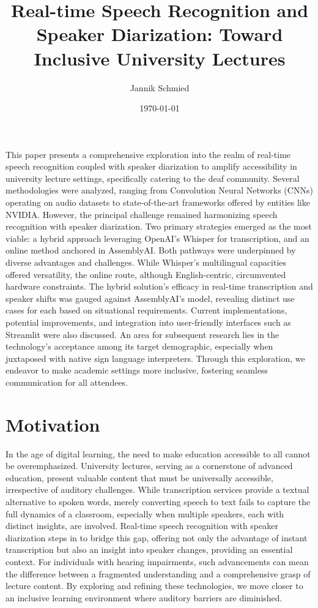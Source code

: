 \documentclass[12pt]{article}
\title{Real-time Speech Recognition and Speaker Diarization: Toward Inclusive University Lectures}
\author{Jannik Schmied}
\date{\today}
\begin{document}
\maketitle

\textbf{\abstractname}
This paper presents a comprehensive exploration into the realm of real-time speech recognition coupled with speaker diarization to amplify accessibility in university lecture settings, specifically catering to the deaf community. Several methodologies were analyzed, ranging from Convolution Neural Networks (CNNs) operating on audio datasets to state-of-the-art frameworks offered by entities like NVIDIA. However, the principal challenge remained harmonizing speech recognition with speaker diarization. Two primary strategies emerged as the most viable: a hybrid approach leveraging OpenAI's Whisper for transcription, and an online method anchored in AssemblyAI. Both pathways were underpinned by diverse advantages and challenges. While Whisper's multilingual capacities offered versatility, the online route, although English-centric, circumvented hardware constraints. The hybrid solution’s efficacy in real-time transcription and speaker shifts was gauged against AssemblyAI's model, revealing distinct use cases for each based on situational requirements. Current implementations, potential improvements, and integration into user-friendly interfaces such as Streamlit were also discussed. An area for subsequent research lies in the technology's acceptance among its target demographic, especially when juxtaposed with native sign language interpreters. Through this exploration, we endeavor to make academic settings more inclusive, fostering seamless communication for all attendees.

\section{Motivation}
\label{sec:motivation}

In the age of digital learning, the need to make education accessible to all cannot be overemphasized. University lectures, serving as a cornerstone of advanced education, present valuable content that must be universally accessible, irrespective of auditory challenges. While transcription services provide a textual alternative to spoken words, merely converting speech to text fails to capture the full dynamics of a classroom, especially when multiple speakers, each with distinct insights, are involved. Real-time speech recognition with speaker diarization steps in to bridge this gap, offering not only the advantage of instant transcription but also an insight into speaker changes, providing an essential context. For individuals with hearing impairments, such advancements can mean the difference between a fragmented understanding and a comprehensive grasp of lecture content. By exploring and refining these technologies, we move closer to an inclusive learning environment where auditory barriers are diminished.
\end{document}
